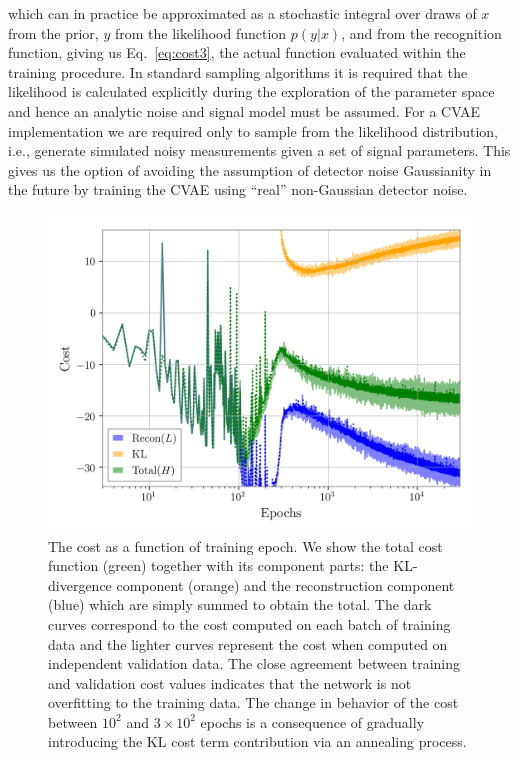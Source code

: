 \documentclass[%
showpacs,
nofootinbib,
 amsmath,amssymb,
 aps,
 twocolumn,
 prl,
 reprint,
floatfix,
]{revtex4-1}
\begin{document}
%
which can in practice be approximated as a stochastic integral over draws of
$x$ from the prior, $y$ from the likelihood function $p(y|x)$, and from the
recognition function, giving us Eq.~\ref{eq:cost3}, the actual function
evaluated within the training procedure. In standard sampling algorithms it is
required that the likelihood is calculated explicitly during the exploration of
the parameter space and hence an analytic noise and signal model must be
assumed. For a \ac{CVAE} implementation we are required only to sample from
the likelihood distribution, i.e., generate simulated noisy measurements given a
set of signal parameters. This gives us the option of avoiding the assumption
of detector noise Gaussianity in the future by training the \ac{CVAE} using ``real''
non-Gaussian detector noise.

%
%
\begin{figure}
    \includegraphics[width=\columnwidth]{inv_losses_log.png}
\caption{\label{fig:loss_log} The cost as a function of training epoch.
We show the total cost function (green) together with its component parts:
the \ac{KL}-divergence component (orange) and the reconstruction component
(blue) which are simply summed to obtain the total. The dark curves correspond
to the cost computed on each batch of training data and the lighter curves
represent the cost when computed on independent validation data. The close
agreement between training and validation cost values indicates that the
network is not overfitting to the training data. The change in behavior of the
cost between $10^2$ and $3\times10^2$ epochs is a consequence of gradually
introducing the \ac{KL} cost term contribution via an annealing process.} 
\end{figure}
\end{document}
